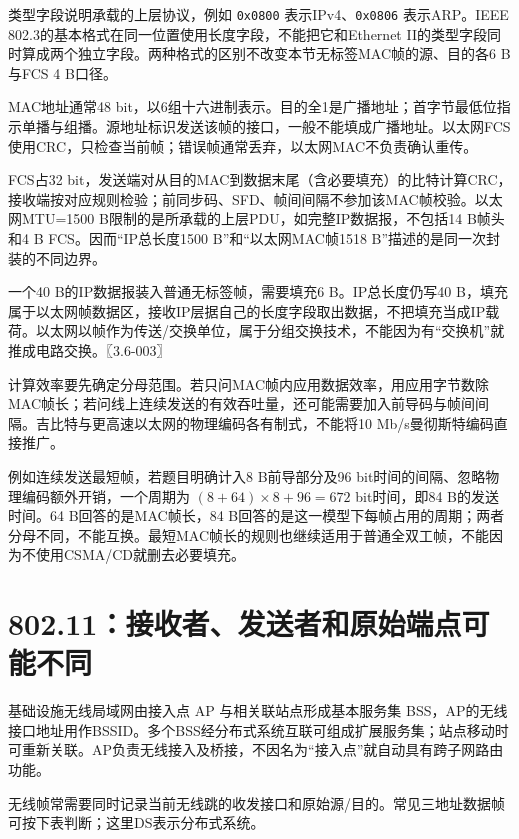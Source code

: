 类型字段说明承载的上层协议，例如 \allowbreak{}\texttt{0x0800} 表示IPv4、\allowbreak{}\texttt{0x0806} 表示ARP。IEEE 802.3的基本格式在同一位置使用长度字段，不能把它和Ethernet II的类型字段同时算成两个独立字段。两种格式的区别不改变本节无标签MAC帧的源、目的各6 B与FCS 4 B口径。

MAC地址通常48 bit，以6组十六进制表示。目的全1是广播地址；首字节最低位指示单播与组播。源地址标识发送该帧的接口，一般不能填成广播地址。以太网FCS使用CRC，只检查当前帧；错误帧通常丢弃，以太网MAC不负责确认重传。

FCS占32 bit，发送端对从目的MAC到数据末尾（含必要填充）的比特计算CRC，接收端按对应规则检验；前同步码、SFD、帧间间隔不参加该MAC帧校验。以太网MTU=1500 B限制的是所承载的上层PDU，如完整IP数据报，不包括14 B帧头和4 B FCS。因而``IP总长度1500 B''和``以太网MAC帧1518 B''描述的是同一次封装的不同边界。

一个40 B的IP数据报装入普通无标签帧，需要填充6 B。IP总长度仍写40 B，填充属于以太网帧数据区，接收IP层据自己的长度字段取出数据，不把填充当成IP载荷。以太网以帧作为传送/交换单位，属于分组交换技术，不能因为有``交换机''就推成电路交换。〖3.6-003〗

计算效率要先确定分母范围。若只问MAC帧内应用数据效率，用应用字节数除MAC帧长；若问线上连续发送的有效吞吐量，还可能需要加入前导码与帧间间隔。吉比特与更高速以太网的物理编码各有制式，不能将10 Mb/s曼彻斯特编码直接推广。

例如连续发送最短帧，若题目明确计入8 B前导部分及96 bit时间的间隔、忽略物理编码额外开销，一个周期为 \((8+64)\times8+96=672\) bit时间，即84 B的发送时间。64 B回答的是MAC帧长，84 B回答的是这一模型下每帧占用的周期；两者分母不同，不能互换。最短MAC帧长的规则也继续适用于普通全双工帧，不能因为不使用CSMA/CD就删去必要填充。

\section{802.11：接收者、发送者和原始端点可能不同}\label{cn-03-16}

基础设施无线局域网由接入点 AP 与相关联站点形成基本服务集 BSS，AP的无线接口地址用作BSSID。多个BSS经分布式系统互联可组成扩展服务集；站点移动时可重新关联。AP负责无线接入及桥接，不因名为``接入点''就自动具有跨子网路由功能。

无线帧常需要同时记录当前无线跳的收发接口和原始源/目的。常见三地址数据帧可按下表判断；这里DS表示分布式系统。

